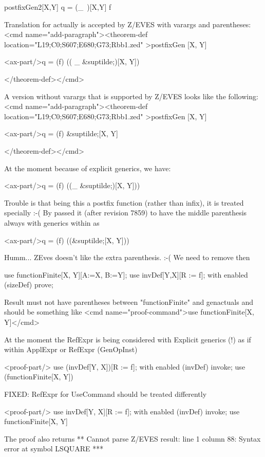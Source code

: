 \begin{theorem}{postfixGen2}[X,Y]
    q = (\_~\inv)[X,Y] f
\end{theorem}
Translation for \inv actually is accepted by Z/EVES with varargs and parentheses:
<cmd name="add-paragraph"><theorem-def location="L19;C0;S607;E680;G73;Rbb1.zed"   >postfixGen
[X, Y]

<ax-part/>q  =  (f) (( _ &suptilde;)[X, Y])

</theorem-def></cmd>


 A version without varargs that is supported by Z/EVES looks like the following:
<cmd name="add-paragraph"><theorem-def location="L19;C0;S607;E680;G73;Rbb1.zed"   >postfixGen
[X, Y]

<ax-part/>q  =  (f) &suptilde;[X, Y]

</theorem-def></cmd>


 At the moment because of explicit generics, we have:

<ax-part/>q  =  (f) ((_ &suptilde;)[X, Y]))

Trouble is that being this a postfix function (rather than infix), it is treated specially :-(
By passed it (after revision 7859) to have the middle parenthesis always with generics within as

<ax-part/>q  =  (f) ((&suptilde;[X, Y]))

Humm... ZEves doesn't like the extra parenthesis. :-( We need to remove then

\begin{zproof}[postfixGen]
use functionFinite[X, Y][A:=X, B:=Y];
use invDef[Y,X][R := f];
with enabled (sizeDef) prove;
\end{zproof}

Result must not have parentheses between "functionFinite" and genactuals and should be something like
<cmd name="proof-command">use functionFinite[X, Y]</cmd>

At the moment the RefExpr is being considered with Explicit generics (!) as if within ApplExpr or RefExpr (GenOpInst)

<proof-part/>
use (invDef[Y, X])[R := f];
with enabled (invDef) invoke;
use (functionFinite[X, Y])

FIXED: RefExpr for UseCommand should be treated differently

<proof-part/> use invDef[Y, X][R := f];
with enabled (invDef) invoke;
use functionFinite[X, Y]

The proof also returns
**
Cannot parse Z/EVES result:
line 1 column 88: Syntax error at symbol LSQUARE
***


